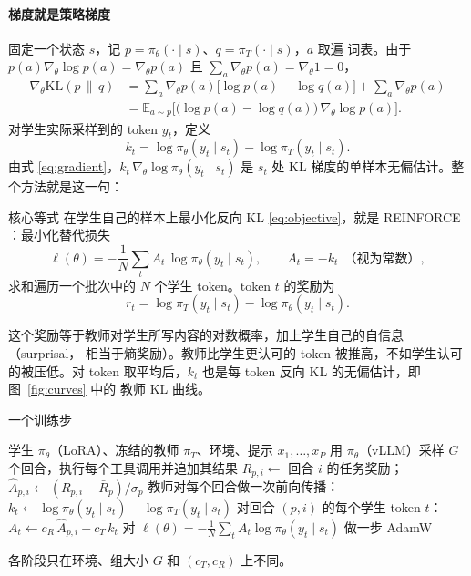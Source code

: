 \documentclass[11pt,a4paper,fontset=none]{ctexart}
\newcommand{\pis}{\pi_\theta}
\newcommand{\pit}{\pi_T}
\newcommand{\KL}{\mathrm{KL}}
\newcommand{\E}{\mathbb{E}}
\begin{document}
\paragraph{梯度就是策略梯度}
固定一个状态 $s$，记 $p=\pis(\cdot\mid s)$、$q=\pit(\cdot\mid s)$，$a$ 取遍
词表。由于 $p(a)\nabla_\theta\log p(a)=\nabla_\theta p(a)$ 且
$\sum_a\nabla_\theta p(a)=\nabla_\theta 1=0$，
\begin{align}
  \nabla_\theta \KL(p\,\|\,q)
  &= \sum_a \nabla_\theta p(a)\big[\log p(a)-\log q(a)\big]
    + \sum_a \nabla_\theta p(a) \nonumber\\
  &= \E_{a\sim p}\Big[\big(\log p(a)-\log q(a)\big)\,\nabla_\theta\log p(a)\Big].
  \label{eq:gradient}
\end{align}
对学生实际采样到的 token $y_t$，定义
\begin{equation}
  k_t = \log\pis(y_t\mid s_t) - \log\pit(y_t\mid s_t).
  \label{eq:k}
\end{equation}
由式 \eqref{eq:gradient}，$k_t\,\nabla_\theta\log\pis(y_t\mid s_t)$ 是 $s_t$
处 KL 梯度的单样本无偏估计。整个方法就是这一句：

\begin{keybox}{核心等式}
在学生自己的样本上最小化反向 KL \eqref{eq:objective}，就是 REINFORCE
\citep{williams1992reinforce}：最小化替代损失
\begin{equation}
  \ell(\theta) = -\frac{1}{N}\sum_{t} A_t\,\log\pis(y_t\mid s_t),
  \qquad A_t = -k_t \ \ \text{（视为常数）},
  \label{eq:loss}
\end{equation}
求和遍历一个批次中的 $N$ 个学生 token。token $t$ 的奖励为
\begin{equation}
  r_t = \log\pit(y_t\mid s_t) - \log\pis(y_t\mid s_t).
  \label{eq:reward}
\end{equation}
\end{keybox}

这个奖励等于教师对学生所写内容的对数概率，加上学生自己的自信息（surprisal，
相当于熵奖励）。教师比学生更认可的 token 被推高，不如学生认可的被压低。对 token
取平均后，$k_t$ 也是每 token 反向 KL 的无偏估计，即图~\ref{fig:curves} 中的
教师 KL 曲线。

\begin{algobox}[label=alg:step]{一个训练步}
\begin{algorithmic}[1]
\Require 学生 $\pis$（LoRA）、冻结的教师 $\pit$、环境、提示 $x_1,\dots,x_P$
  \State 用 $\pis$（vLLM）采样 $G$ 个回合，执行每个工具调用并追加其结果
  \State $R_{p,i}\gets$ 回合 $i$ 的任务奖励；\quad
    $\hat A_{p,i}\gets(R_{p,i}-\bar R_p)/\sigma_p$
\EndFor
\State 教师对每个回合做一次前向传播：
  $k_t\gets\log\pis(y_t\mid s_t)-\log\pit(y_t\mid s_t)$
\State 对回合 $(p,i)$ 的每个学生 token $t$：$A_t\gets c_R\,\hat A_{p,i}-c_T\,k_t$
\State 对 $\ell(\theta)=-\frac{1}{N}\sum_t A_t\log\pis(y_t\mid s_t)$
  做一步 AdamW
\end{algorithmic}
\smallskip
{\small\color{wr-taupe}各阶段只在环境、组大小 $G$ 和 $(c_T, c_R)$ 上不同。}
\end{algobox}
\end{document}
